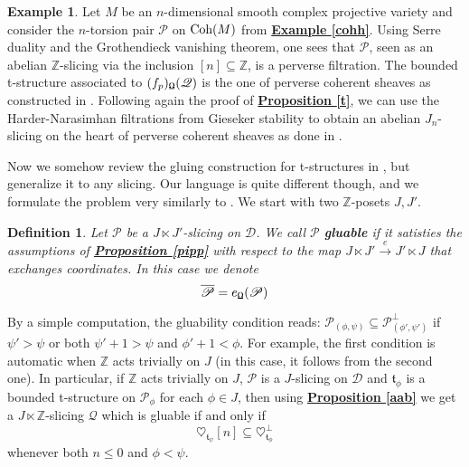 \documentclass{article}
\newtheorem{defn}[thm]{Definition}
\theoremstyle{definition}
\newtheorem{exmp}[thm]{Example}
\begin{document}
\begin{exmp}
Let $M$ be an $n$-dimensional smooth complex projective variety and consider the $n$-torsion pair $\mathscr{P}$ on $\textnormal{Coh}(M)$ from \hyperref[cohh]{\textbf{Example \ref*{cohh}}}. Using Serre duality and the Grothendieck vanishing theorem, one sees that $\mathscr{P}$, seen as an abelian $\mathbb{Z}$-slicing via the inclusion $[n] \subseteq \mathbb{Z}$, is a perverse filtration. The bounded t-structure associated to $(f_p)_{\textnormal{\Libra}}(\mathscr{Q})$ is the one of perverse coherent sheaves as constructed in \cite{bez}. Following again the proof of \hyperref[t]{\textbf{Proposition \ref*{t}}}, we can use the Harder-Narasimhan filtrations from Gieseker stability to obtain an abelian $J_n$-slicing on the heart of perverse coherent sheaves as done in \cite{perpol}. 
\end{exmp}

Now we somehow review the gluing construction for t-structures in \cite{del}, but generalize it to any slicing. Our language is quite different though, and we formulate the problem very similarly to \cite{glu}. We start with two $\mathbb{Z}$-posets $J,J'$. 

\begin{defn}
Let $\mathscr{P}$ be a $J \ltimes J'$-slicing on $\mathscr{D}$. We call $\mathscr{P}$ \textbf{gluable} if it satisties the assumptions of \hyperref[pipp]{\textbf{Proposition \ref*{pipp}}} with respect to the map $J \ltimes J' \overset{e}{\longrightarrow} J' \ltimes J$ that exchanges coordinates. In this case we denote $$\overline{\mathscr{P}}=e_{\textnormal{\Libra}}(\mathscr{P})$$
\end{defn}

By a simple computation, the gluability condition reads: $\mathscr{P}_{(\phi,\psi)} \subseteq \mathscr{P}_{(\phi',\psi')}^{\perp}$ if $\psi' > \psi$ or both $\psi'+1>\psi$ and $\phi'+1 < \phi$. For example, the first condition is automatic when $\mathbb{Z}$ acts trivially on $J$ (in this case, it follows from the second one). In particular, if $\mathbb{Z}$ acts trivially on $J$, $\mathscr{P}$ is a $J$-slicing on $\mathscr{D}$ and $\mathfrak{t}_{\phi}$ is a bounded t-structure on $\mathscr{P}_{\phi}$ for each $\phi \in J$, then using \hyperref[aab]{\textbf{Proposition \ref*{aab}}} we get a $J \ltimes \mathbb{Z}$-slicing $\mathscr{Q}$ which is gluable if and only if $$\heartsuit_{\mathfrak{t}_{\psi}}[n] \subseteq \heartsuit_{\mathfrak{t}_{\phi}}^{\perp}$$
whenever both $n \le 0$ and $\phi < \psi$. 
\end{document}
